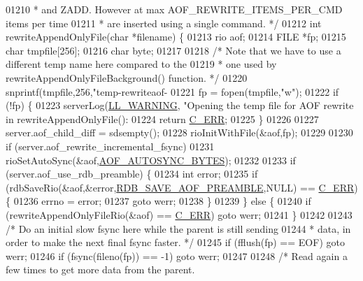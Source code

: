 \begin{DoxyCode}
{{{{{{{{{{{{{{{{01210 \textcolor{comment}{ * and ZADD. However at max AOF\_REWRITE\_ITEMS\_PER\_CMD items per time}
01211 \textcolor{comment}{ * are inserted using a single command. */}
01212 \textcolor{keywordtype}{int} rewriteAppendOnlyFile(\textcolor{keywordtype}{char} *filename) \{
01213     rio aof;
01214     FILE *fp;
01215     \textcolor{keywordtype}{char} tmpfile[256];
01216     \textcolor{keywordtype}{char} byte;
01217 
01218     \textcolor{comment}{/* Note that we have to use a different temp name here compared to the}
01219 \textcolor{comment}{     * one used by rewriteAppendOnlyFileBackground() function. */}
01220     snprintf(tmpfile,256,\textcolor{stringliteral}{"temp-rewriteaof-%
01221     fp = fopen(tmpfile,\textcolor{stringliteral}{"w"});
01222     \textcolor{keywordflow}{if} (!fp) \{
01223         serverLog(\hyperlink{server_8h_a31229b9334bba7d6be2a72970967a14b}{LL\_WARNING}, \textcolor{stringliteral}{"Opening the temp file for AOF rewrite in
       rewriteAppendOnlyFile(): %
01224         \textcolor{keywordflow}{return} \hyperlink{server_8h_af98ac28d5f4d23d7ed5985188e6fb7d1}{C\_ERR};
01225     \}
01226 
01227     server.aof\_child\_diff = sdsempty();
01228     rioInitWithFile(&aof,fp);
01229 
01230     \textcolor{keywordflow}{if} (server.aof\_rewrite\_incremental\_fsync)
01231         rioSetAutoSync(&aof,\hyperlink{server_8h_a953d4b2370e4b9accbfa596a022a8979}{AOF\_AUTOSYNC\_BYTES});
01232 
01233     \textcolor{keywordflow}{if} (server.aof\_use\_rdb\_preamble) \{
01234         \textcolor{keywordtype}{int} error;
01235         \textcolor{keywordflow}{if} (rdbSaveRio(&aof,&error,\hyperlink{rdb_8h_a0bafda4fc4a08ebf980ba8e2a1bd3b78}{RDB\_SAVE\_AOF\_PREAMBLE},NULL) == 
      \hyperlink{server_8h_af98ac28d5f4d23d7ed5985188e6fb7d1}{C\_ERR}) \{
01236             errno = error;
01237             \textcolor{keywordflow}{goto} werr;
01238         \}
01239     \} \textcolor{keywordflow}{else} \{
01240         \textcolor{keywordflow}{if} (rewriteAppendOnlyFileRio(&aof) == \hyperlink{server_8h_af98ac28d5f4d23d7ed5985188e6fb7d1}{C\_ERR}) \textcolor{keywordflow}{goto} werr;
01241     \}
01242 
01243     \textcolor{comment}{/* Do an initial slow fsync here while the parent is still sending}
01244 \textcolor{comment}{     * data, in order to make the next final fsync faster. */}
01245     \textcolor{keywordflow}{if} (fflush(fp) == EOF) \textcolor{keywordflow}{goto} werr;
01246     \textcolor{keywordflow}{if} (fsync(fileno(fp)) == -1) \textcolor{keywordflow}{goto} werr;
01247 
01248     \textcolor{comment}{/* Read again a few times to get more data from the parent.}
}}}}}}}}}}}}}}}}}}
\end{DoxyCode}

